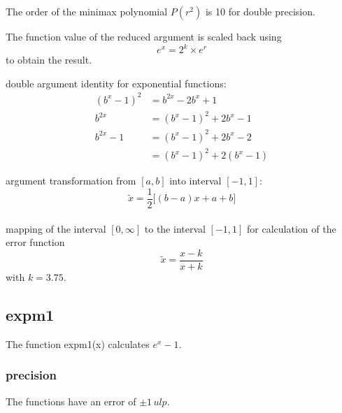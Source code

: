 \documentclass[10pt,a4paper,draft]{article}
\numberwithin{equation}{subsection}
\begin{document}
    The order of the minimax polynomial $P(r^2)$ is 10 for double precision.

 The function value of the reduced argument is scaled back using
    \begin{equation}
        e^x = 2^k \times e^r
    \end{equation}
    to obtain the result.



double argument identity for exponential functions:
\[
    \begin{aligned}
        (b^x-1)^2 &= b^{2x} - 2b^x + 1 \\
        b^{2x}    &= (b^x-1)^2 + 2b^x - 1 \\
        b^{2x} -1 &= (b^x-1)^2 + 2b^x -2 \\
                  &= (b^x-1)^2 + 2(b^x-1)
    \end{aligned}
\]

argument transformation from $ [a, b] $ into interval $ [-1, 1] $:
\[
    \tilde x = \frac{1}{2} \big[(b-a) x + a +b \big]
\]
\\[10pt]
mapping of the interval $ [0, \infty] $ to the interval $ [-1, 1] $ for
calculation of the error function
\[
    \tilde x = \frac{x-k}{x+k}
\]
with $ k = 3.75 $.


\subsection{expm1}
\label{sub_sec:expm1}
The function expm1(x) calculates $ e^x-1 $.

\subsubsection{precision}
The functions have an error of $ \pm 1\, ulp$.
\end{document}

